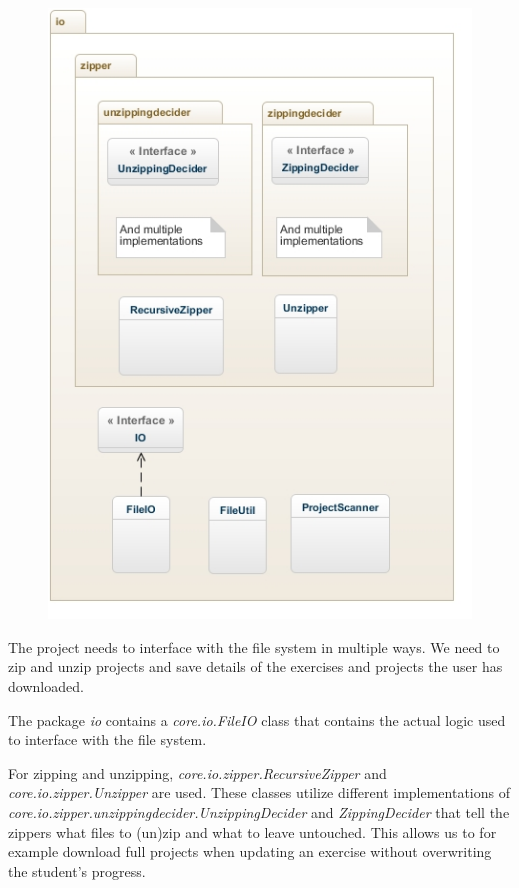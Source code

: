 \documentclass[12pt,a4paper,english,leqno]{article}
\begin{document}
\begin{figure}[H]
\centering
\includegraphics[scale=1]{img/io.jpg}
\end{figure}

The project needs to interface with the file system in multiple ways.
We need to zip and unzip projects and save details of the exercises and projects the user has downloaded.

The package \textit{io} contains a \textit{core.io.FileIO} class that contains the actual logic used to interface with the file system.

For zipping and unzipping, \textit{core.io.zipper.RecursiveZipper} and \textit{core.io.zipper.Unzipper} are used.
These classes utilize different implementations of \textit{core.io.zipper.unzippingdecider.UnzippingDecider} and \textit{ZippingDecider} that tell the zippers what files to (un)zip and what to leave untouched.
This allows us to for example download full projects when updating an exercise without overwriting the student's progress.
\end{document}
